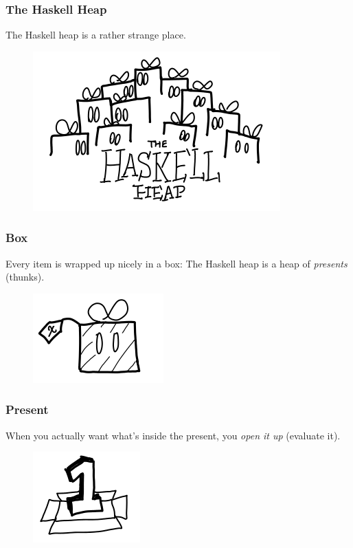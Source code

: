\documentclass{beamer}
\begin{document}
\begin{frame}
\frametitle{The Haskell Heap}
\begin{center}
    The Haskell heap is a rather strange place.
\end{center}
\begin{figure}[hbt!]
    \centering
    \includegraphics[height=0.5\textheight]{./pic/haskell-heap.png}
\end{figure}
\end{frame}


\begin{frame}
\frametitle{Box}
Every item is wrapped up nicely in a box:\newline
The Haskell heap is a heap of \textit{presents} (thunks).
\begin{figure}[hbt!]
    \centering
    \includegraphics[height=0.4\textheight]{./pic/thunk.png}
\end{figure}
\end{frame}


\begin{frame}
\frametitle{Present}
When you actually want what’s inside the present, you \textit{open it up} (evaluate it).\newline
\begin{figure}[hbt!]
    \centering
    \includegraphics[height=0.4\textheight]{./pic/thunk-nullary.png}
\end{figure}
\end{frame}
\end{document}
